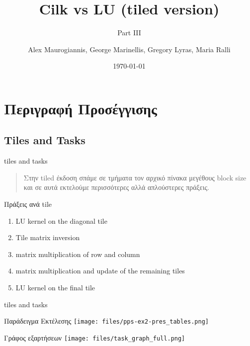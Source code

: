 \documentclass{beamer}
\author[afein,fedjo,mastergreg,mariaral]{Alex Maurogiannis, George Marinellis, Gregory Lyras, Maria Ralli}
\institute{CSlab @ NTUA}
\title{Cilk vs LU (tiled version)}
\subtitle{Part III}
\date{\today}
\begin{document}
\begin{frame}
    \titlepage
\end{frame}

\section{Περιγραφή Προσέγγισης}
\subsection{Tiles and Tasks}
\begin{frame}{tiles and tasks}
    \begin{quote}
        Στην tiled έκδοση σπάμε σε τμήματα τον αρχικό πίνακα μεγέθους block size
        και σε αυτά εκτελούμε περισσότερες αλλά απλούστερες πράξεις.
    \end{quote}
    \pause

    \begin{block}{Πράξεις ανά tile}
        \begin{enumerate}
            \item<2-> LU kernel on the diagonal tile
            \item<3-> Tile matrix inversion
            \item<4-> matrix multiplication of row and column
            \item<5-> matrix multiplication and update of the remaining tiles
            \item<6-> LU kernel on the final tile
            
        \end{enumerate}
    \end{block}

\end{frame}

\begin{frame}{tiles and tasks}
    \begin{block}{Παράδειγμα Εκτέλεσης}
        \texttt{[image: files/pps-ex2-pres\_tables.png]}
    \end{block}
\end{frame}

\begin{frame}{Γράφος εξαρτήσεων}
    \texttt{[image: files/task\_graph\_full.png]}
\end{frame}
\end{document}
